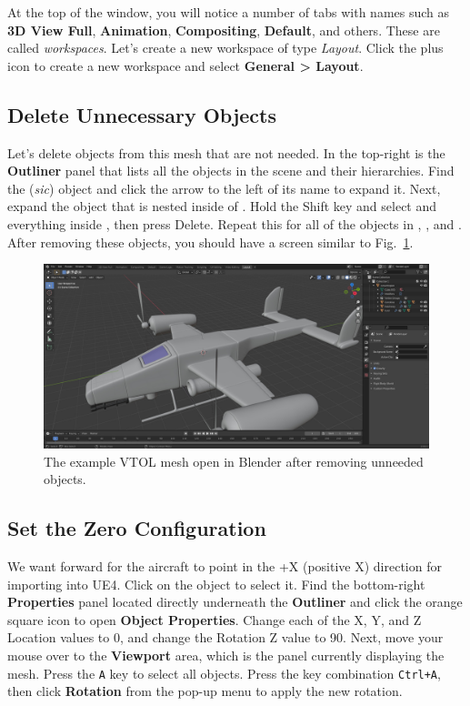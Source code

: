 At the top of the window, you will notice a number of tabs with names such as \textbf{3D View Full}, \textbf{Animation}, \textbf{Compositing}, \textbf{Default}, and others. These are called \textit{workspaces}. Let's create a new workspace of type \textit{Layout}. Click the plus icon to create a new workspace and select \textbf{General > Layout}.

\subsection{Delete Unnecessary Objects}
Let's delete objects from this mesh that are not needed. In the top-right is the \textbf{Outliner} panel that lists all the objects in the scene and their hierarchies. Find the  (\textit{sic}) object and click the arrow to the left of its name to expand it. Next, expand the  object that is nested inside of . Hold the Shift key and select  and everything inside , then press Delete. Repeat this for all of the objects in , , and . After removing these objects, you should have a screen similar to Fig.~\ref{fig:blender_begin}.

\begin{figure}[t]
    \centering
    \includegraphics[width=\textwidth]{figures/blender_begin_alt}
    \caption[Blender screen of example VTOL mesh]{
        The example VTOL mesh open in Blender after removing unneeded objects.}%
    \label{fig:blender_begin}
\end{figure}

\subsection{Set the Zero Configuration}
We want forward for the aircraft to point in the +X (positive X) direction for importing into UE4. Click on the  object to select it. Find the bottom-right \textbf{Properties} panel located directly underneath the \textbf{Outliner} and click the orange square icon to open \textbf{Object Properties}. Change each of the X, Y, and Z Location values to 0, and change the Rotation Z value to 90. Next, move your mouse over to the \textbf{Viewport} area, which is the panel currently displaying the mesh. Press the \texttt{A} key to select all objects. Press the key combination \texttt{Ctrl+A}, then click \textbf{Rotation} from the pop-up menu to apply the new rotation.

